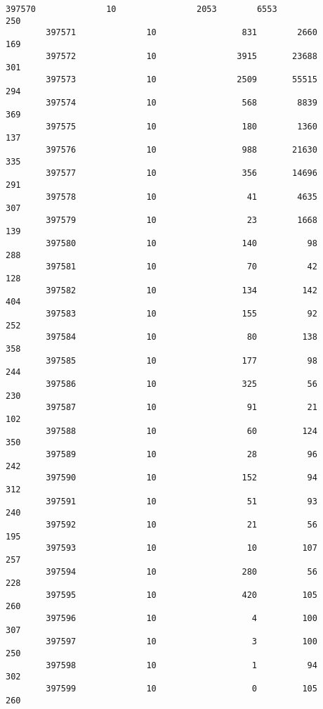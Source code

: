 \documentclass[11pt]{article}
\begin{document}
\begin{Verbatim}[commandchars=\\\{\}]
        397570              10                2053        6553              250   
        397571              10                 831        2660              169   
        397572              10                3915       23688              301   
        397573              10                2509       55515              294   
        397574              10                 568        8839              369   
        397575              10                 180        1360              137   
        397576              10                 988       21630              335   
        397577              10                 356       14696              291   
        397578              10                  41        4635              307   
        397579              10                  23        1668              139   
        397580              10                 140          98              288   
        397581              10                  70          42              128   
        397582              10                 134         142              404   
        397583              10                 155          92              252   
        397584              10                  80         138              358   
        397585              10                 177          98              244   
        397586              10                 325          56              230   
        397587              10                  91          21              102   
        397588              10                  60         124              350   
        397589              10                  28          96              242   
        397590              10                 152          94              312   
        397591              10                  51          93              240   
        397592              10                  21          56              195   
        397593              10                  10         107              257   
        397594              10                 280          56              228   
        397595              10                 420         105              260   
        397596              10                   4         100              307   
        397597              10                   3         100              250   
        397598              10                   1          94              302   
        397599              10                   0         105              260   
        

\end{Verbatim}
\end{document}
